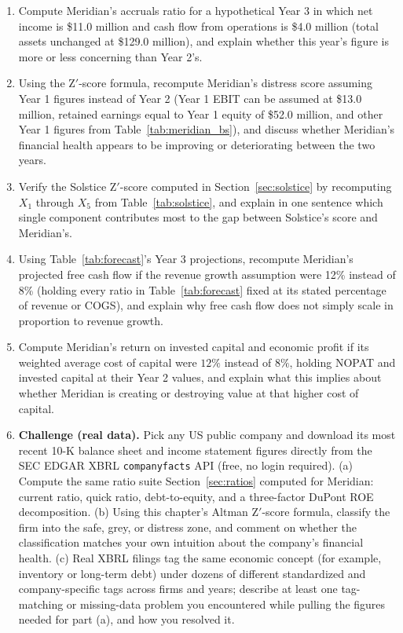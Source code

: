 \documentclass[../ai_in_finance]{subfiles}
\begin{document}
\begin{enumerate}
    \item Compute Meridian's accruals ratio for a hypothetical Year 3 in which net income is \$11.0 million and cash flow from operations is \$4.0 million (total assets unchanged at \$129.0 million), and explain whether this year's figure is more or less concerning than Year 2's.
    \item Using the Z$'$-score formula, recompute Meridian's distress score assuming Year 1 figures instead of Year 2 (Year 1 EBIT can be assumed at \$13.0 million, retained earnings equal to Year 1 equity of \$52.0 million, and other Year 1 figures from Table~\ref{tab:meridian_bs}), and discuss whether Meridian's financial health appears to be improving or deteriorating between the two years.
    \item Verify the Solstice Z$'$-score computed in Section~\ref{sec:solstice} by recomputing $X_1$ through $X_5$ from Table~\ref{tab:solstice}, and explain in one sentence which single component contributes most to the gap between Solstice's score and Meridian's.
    \item Using Table~\ref{tab:forecast}'s Year 3 projections, recompute Meridian's projected free cash flow if the revenue growth assumption were 12\% instead of 8\% (holding every ratio in Table~\ref{tab:forecast} fixed at its stated percentage of revenue or COGS), and explain why free cash flow does not simply scale in proportion to revenue growth.
    \item Compute Meridian's return on invested capital and economic profit if its weighted average cost of capital were $12\%$ instead of $8\%$, holding NOPAT and invested capital at their Year 2 values, and explain what this implies about whether Meridian is creating or destroying value at that higher cost of capital.
    \item \textbf{Challenge (real data).} Pick any US public company and download its most recent 10-K balance sheet and income statement figures directly from the SEC EDGAR XBRL \texttt{companyfacts} API (free, no login required). (a) Compute the same ratio suite Section~\ref{sec:ratios} computed for Meridian: current ratio, quick ratio, debt-to-equity, and a three-factor DuPont ROE decomposition. (b) Using this chapter's Altman Z$'$-score formula, classify the firm into the safe, grey, or distress zone, and comment on whether the classification matches your own intuition about the company's financial health. (c) Real XBRL filings tag the same economic concept (for example, inventory or long-term debt) under dozens of different standardized and company-specific tags across firms and years; describe at least one tag-matching or missing-data problem you encountered while pulling the figures needed for part (a), and how you resolved it.
\end{enumerate}
\end{document}

